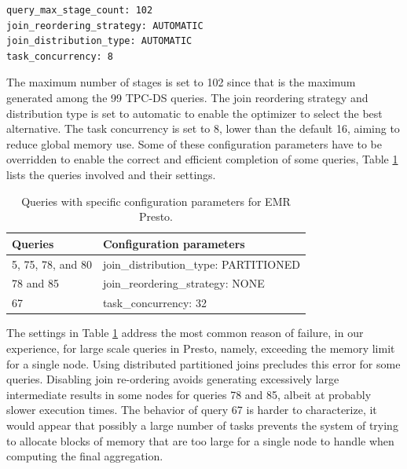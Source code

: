 \vspace{0.5cm}

\begin{lstlisting}[caption={Reference results EMR Presto configuration parameters.},label=listing:prestoConfigurationParameters,captionpos=b,frame=single]
query_max_stage_count: 102
join_reordering_strategy: AUTOMATIC
join_distribution_type: AUTOMATIC
task_concurrency: 8

\end{lstlisting}

The maximum number of stages is set to 102 since that is the maximum generated among the 99 TPC-DS queries. The join reordering strategy and distribution type is set to automatic to enable the optimizer to select the best alternative. The task concurrency is set to 8, lower than the default 16, aiming to reduce global memory use. Some of these configuration parameters have to be overridden to enable the correct and efficient completion of some queries, Table \ref{table:prestoQueryConfigurationParameters} lists the queries involved and their settings.

\begin{table}
  \centering
	\begin{tabular}{|l|l|}
	  \hline
		\textbf{Queries} & \textbf{Configuration parameters} \\ \hline
		5, 75, 78, and 80 & join\_distribution\_type: PARTITIONED \\ \hline
		78 and 85 & join\_reordering\_strategy: NONE \\ \hline
		67 & task\_concurrency: 32
		\\
		\hline
	\end{tabular}
	\caption{Queries with specific configuration parameters for EMR Presto.}
	\label{table:prestoQueryConfigurationParameters}
\end{table}

The settings in Table \ref{table:prestoQueryConfigurationParameters} address the most common reason of failure, in our experience, for large scale queries in Presto, namely, exceeding the memory limit for a single node. Using distributed partitioned joins precludes this error for some queries. Disabling join re-ordering avoids generating excessively large intermediate results in some nodes for queries 78 and 85, albeit at probably slower execution times. The behavior of query 67 is harder to characterize, it would appear that possibly a large number of tasks prevents the system of trying to allocate blocks of memory that are too large for a single node to handle when computing the final aggregation.

